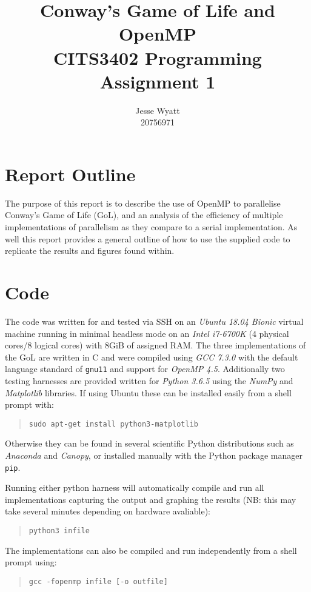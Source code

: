 \documentclass[]{article}
\title{Conway's Game of Life and OpenMP\\
\large CITS3402 Programming Assignment 1}
\author{Jesse Wyatt\\20756971}
\begin{document}
\maketitle

\begin{abstract}

\end{abstract}

\section{Report Outline}
The purpose of this report is to describe the use of OpenMP to parallelise Conway's Game of Life (GoL), and an analysis of the efficiency of multiple implementations of parallelism as they compare to a serial implementation. As well this report provides a general outline of how to use the supplied code to replicate the results and figures found within.

\section{Code}
The code was written for and tested via SSH on an \textit{Ubuntu 18.04 Bionic} virtual machine running in minimal headless mode on an \textit{Intel i7-6700K} (4 physical cores/8 logical cores) with 8GiB of assigned RAM. The three implementations of the GoL are written in C and were compiled using \textit{GCC 7.3.0} with the default language standard of \texttt{gnu11} and support for \textit{OpenMP 4.5}. Additionally two testing harnesses are provided written for \textit{Python 3.6.5} using the \textit{NumPy} and \textit{Matplotlib} libraries. If using Ubuntu these can be installed easily from a shell prompt with:
\begin{quote}
	\texttt{sudo apt-get install python3-matplotlib}
\end{quote}
Otherwise they can be found in several scientific Python distributions such as \textit{Anaconda} and \textit{Canopy}, or installed manually with the Python package manager \texttt{pip}.

Running either python harness will automatically compile and run all implementations capturing the output and graphing the results (NB: this may take several minutes depending on hardware avaliable):
\begin{quote}
\texttt{python3 infile}
\end{quote}

The implementations can also be compiled and run independently from a shell prompt using:
\begin{quote}
\texttt{gcc -fopenmp infile [-o outfile]}
\end{quote}
\end{document}
